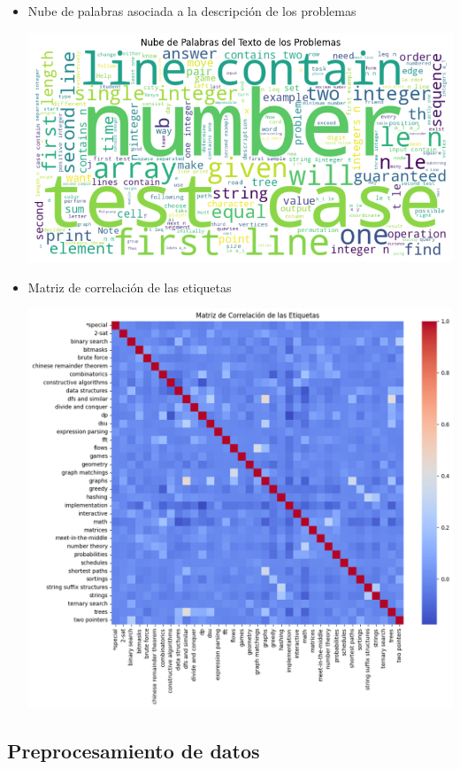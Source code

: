 \documentclass{article}
\begin{document}
\begin{itemize}
    \item Nube de palabras asociada a la descripción de los problemas
          \begin{center}
              \includegraphics[scale=0.55]{imgs/wordcloud.png}
          \end{center}
    \item Matriz de correlación de las etiquetas
          \begin{center}
              \includegraphics[scale=0.5]{imgs/correlation_matrix.png}
          \end{center}
\end{itemize}

\subsection{Preprocesamiento de datos}
\end{document}
